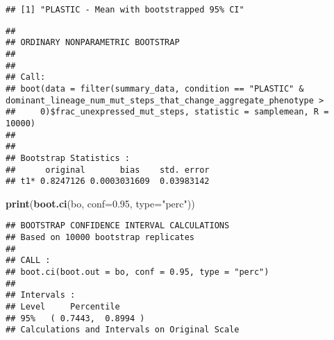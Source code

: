 \documentclass[]{book}
\newenvironment{Shaded}{\begin{snugshade}}{\end{snugshade}}
\newcommand{\DataTypeTok}[1]{\textcolor[rgb]{0.13,0.29,0.53}{#1}}
\newcommand{\DecValTok}[1]{\textcolor[rgb]{0.00,0.00,0.81}{#1}}
\newcommand{\FloatTok}[1]{\textcolor[rgb]{0.00,0.00,0.81}{#1}}
\newcommand{\KeywordTok}[1]{\textcolor[rgb]{0.13,0.29,0.53}{\textbf{#1}}}
\newcommand{\NormalTok}[1]{#1}
\newcommand{\OperatorTok}[1]{\textcolor[rgb]{0.81,0.36,0.00}{\textbf{#1}}}
\newcommand{\StringTok}[1]{\textcolor[rgb]{0.31,0.60,0.02}{#1}}
\begin{document}
\begin{verbatim}
## [1] "PLASTIC - Mean with bootstrapped 95% CI"
\end{verbatim}

\begin{Shaded}
\end{Shaded}

\begin{verbatim}
## 
## ORDINARY NONPARAMETRIC BOOTSTRAP
## 
## 
## Call:
## boot(data = filter(summary_data, condition == "PLASTIC" & dominant_lineage_num_mut_steps_that_change_aggregate_phenotype > 
##     0)$frac_unexpressed_mut_steps, statistic = samplemean, R = 10000)
## 
## 
## Bootstrap Statistics :
##      original       bias    std. error
## t1* 0.8247126 0.0003031609  0.03983142
\end{verbatim}

\begin{Shaded}
\begin{Highlighting}[]
\KeywordTok{print}\NormalTok{(}\KeywordTok{boot.ci}\NormalTok{(bo, }\DataTypeTok{conf=}\FloatTok{0.95}\NormalTok{, }\DataTypeTok{type=}\StringTok{"perc"}\NormalTok{))}
\end{Highlighting}
\end{Shaded}

\begin{verbatim}
## BOOTSTRAP CONFIDENCE INTERVAL CALCULATIONS
## Based on 10000 bootstrap replicates
## 
## CALL : 
## boot.ci(boot.out = bo, conf = 0.95, type = "perc")
## 
## Intervals : 
## Level     Percentile     
## 95%   ( 0.7443,  0.8994 )  
## Calculations and Intervals on Original Scale
\end{verbatim}

\begin{Shaded}
\end{Shaded}
\end{document}
